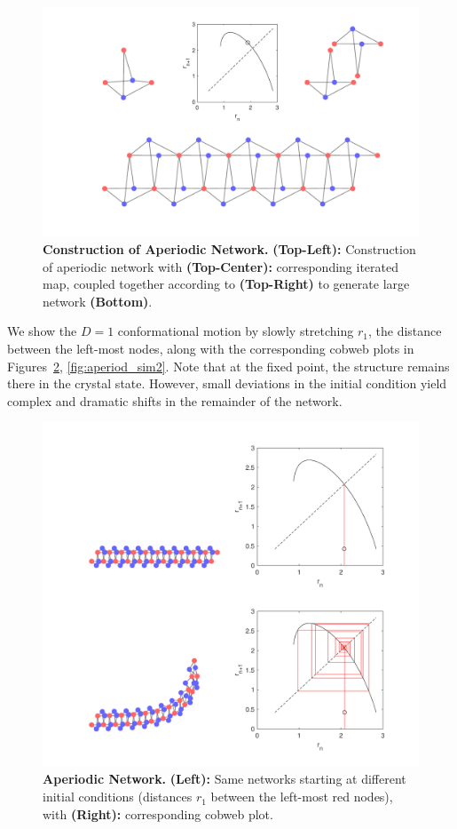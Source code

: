 \documentclass[12pt]{revtex4-1}
\begin{document}
\begin{figure}[h!]
	\centering
	\includegraphics[width=1.0\columnwidth]{aperiod.pdf}
	\caption{\textbf{Construction of Aperiodic Network.} \textbf{(Top-Left):} Construction of aperiodic network with \textbf{(Top-Center):} corresponding iterated map, coupled together according to \textbf{(Top-Right)} to generate large network \textbf{(Bottom)}.}
	\label{fig:aperiod}
\end{figure}

We show the $D=1$ conformational motion by slowly stretching $r_1$, the distance between the left-most nodes, along with the corresponding cobweb plots in Figures~\ref{fig:aperiod_sim}, \ref{fig:aperiod_sim2}. Note that at the fixed point, the structure remains there in the crystal state. However, small deviations in the initial condition yield complex and dramatic shifts in the remainder of the network. 

\begin{figure}[h!]
	\centering
	\includegraphics[width=1.0\columnwidth]{aperiod_sim.pdf}
	\caption{\textbf{Aperiodic Network.} \textbf{(Left):} Same networks starting at different initial conditions (distances $r_1$ between the left-most red nodes), with \textbf{(Right):} corresponding cobweb plot.}
	\label{fig:aperiod_sim}
\end{figure}
\end{document}
